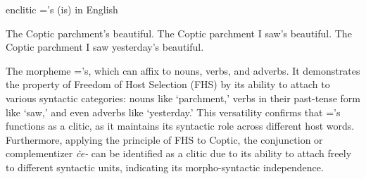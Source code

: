 \documentclass[output=paper,colorlinks,citecolor=brown ,chinesefont]{langscibook}
\begin{document}
\begin{exe}
\ex 	enclitic =’s (is) in English \label{EnglishIs}
\begin{xlist}
    \ex The Coptic parchment’s beautiful.
    \ex The Coptic parchment I saw’s beautiful.
    \ex The Coptic parchment I saw yesterday’s beautiful.
\end{xlist}
\end{exe}
	
The morpheme ='s, which can affix to nouns, verbs, and adverbs. It demonstrates the property of Freedom of Host Selection (FHS) by its ability to attach to various syntactic categories: nouns like ‘parchment,' verbs in their past-tense form like ‘saw,' and even adverbs like ‘yesterday.' This versatility confirms that =’s functions as a clitic, as it maintains its syntactic role across different host words.
Furthermore, applying the principle of FHS to Coptic, the conjunction or complementizer  \textit{če-} can be identified as a clitic due to its ability to attach freely to different syntactic units, indicating its morpho-syntactic independence.
\end{document}
